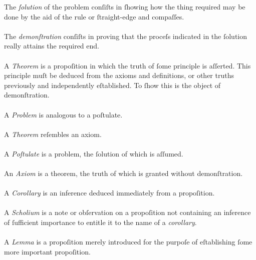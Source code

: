 \pagebreak

\begin{minipage}{0.33\textwidth}
    \phantom{}
\end{minipage}%
\begin{minipage}{0.67\textwidth}
    \raggedright
    The \textit{ſolution} of the problem conſiſts in ſhowing how the thing required may be done by the aid of the rule or ſtraight-edge and compaſſes.\\
    \hfill\\
    The \textit{demonſtration} conſiſts in proving that the proceſs indicated in the ſolution really attains the required end.\\
    \hfill\\
    A \textit{Theorem} is a propoſition in which the truth of ſome principle is aſſerted. This principle muſt be deduced from the axioms and definitions, or other truths previously and independently eſtablished. To ſhow this is the object of demonſtration.\\
    \hfill\\
    A \textit{Problem} is analogous to a poſtulate.\\
    \hfill\\
    A \textit{Theorem} reſembles an axiom.\\
    \hfill\\
    A \textit{Poſtulate} is a problem, the ſolution of which is aſſumed.\\
    \hfill\\
    An \textit{Axiom} is a theorem, the truth of which is granted without demonſtration.\\
    \hfill\\
    A \textit{Corollary} is an inference deduced immediately from a propoſition.\\
    \hfill\\
    A \textit{Scholium} is a note or obſervation on a propoſition not containing an inference of ſufficient importance to entitle it to the name of a \textit{corollary}.\\
    \hfill\\
    A \textit{Lemma} is a propoſition merely introduced for the purpoſe of eſtablishing ſome more important propoſition.
\end{minipage}

\pagebreak

\pagestyle{fancy}
\fancyhf{}
\renewcommand{\headrulewidth}{0pt}
%

